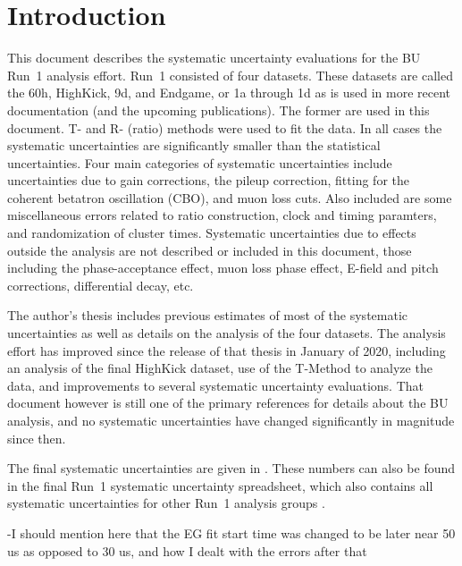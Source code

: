 
\graphicspath{}

\section{Introduction}


This document describes the systematic uncertainty evaluations for the BU Run~1 \wa analysis effort. Run~1 consisted of four datasets. These datasets are called the 60h, HighKick, 9d, and Endgame, or 1a through 1d as is used in more recent documentation (and the upcoming publications). The former are used in this document. T- and R- (ratio) methods were used to fit the data. In all cases the systematic uncertainties are significantly smaller than the statistical uncertainties. Four main categories of systematic uncertainties include uncertainties due to gain corrections, the pileup correction, fitting for the coherent betatron oscillation (CBO), and muon loss cuts. Also included are some miscellaneous errors related to ratio construction, clock and timing paramters, and randomization of cluster times. Systematic uncertainties due to effects outside the \wa analysis are not described or included in this document, those including the phase-acceptance effect, muon loss phase effect, E-field and pitch corrections, differential decay, etc.

The author's thesis \cite{phdthesis:2020Kinnaird} includes previous estimates of most of the systematic uncertainties as well as details on the analysis of the four datasets. The analysis effort has improved since the release of that thesis in January of 2020, including an analysis of the final HighKick dataset, use of the T-Method to analyze the data, and improvements to several systematic uncertainty evaluations. That document however is still one of the primary references for details about the BU \wa analysis, and no systematic uncertainties have changed significantly in magnitude since then.

The final systematic uncertainties are given in . These numbers can also be found in the final Run~1 systematic uncertainty spreadsheet, which also contains all systematic uncertainties for other Run~1 analysis groups \cite{UncertaintySpreadsheet}.



-I should mention here that the EG fit start time was changed to be later near 50 us as opposed to 30 us, and how I dealt with the errors after that






